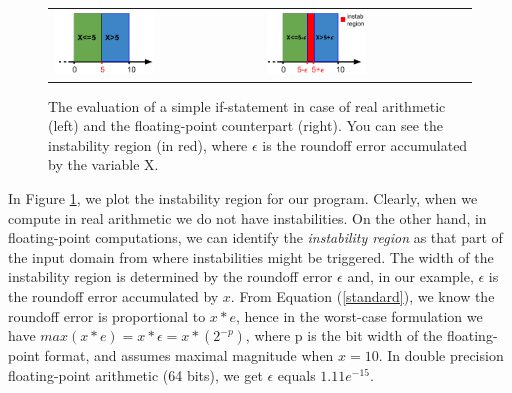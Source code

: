 \begin{figure}[tb!]
	\centering
	\begin{tabular}{ll}
		\includegraphics[width=0.5\textwidth]{pic/ifreal.png}
		&
		\includegraphics[width=0.5\textwidth]{pic/iffp.png}
	\end{tabular}
	\caption{The evaluation of a simple if-statement in case of real arithmetic (left) and the floating-point counterpart (right). You can see the instability region (in red), where $\epsilon$ is the roundoff error accumulated by the variable X.}
	\label{fig:ifreal}
\end{figure}

In Figure \ref{fig:ifreal}, we plot the instability region for our program. Clearly, when we compute in real arithmetic we do not have instabilities. On the other hand, in floating-point computations, we can identify the \emph{instability region} as that part of the input domain from where instabilities might be triggered.
%
The width of the instability region is determined by the roundoff error $\epsilon$ and, in our example, $\epsilon$ is the roundoff error accumulated by $x$. From Equation (\ref{standard}), we know the roundoff error is proportional to $x*e$, hence in the worst-case formulation we have $max(x*e) = x*\epsilon = x*(2^{-p})$, where p is the bit width of the floating-point format, and assumes maximal magnitude when $x=10$.  
%
In double precision floating-point arithmetic (64 bits), we get $\epsilon$ equals $1.11e^{-15}$.
%

